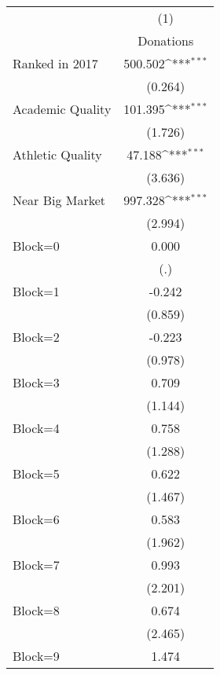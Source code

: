 {
\def\sym#1{\ifmmode^{#1}\else\(^{#1}\)\fi}
\begin{tabular}{l*{1}{c}}
\hline\hline
                    &\multicolumn{1}{c}{(1)}\\
                    &\multicolumn{1}{c}{Donations}\\
\hline
Ranked in 2017      &     500.502\sym{***}\\
                    &     (0.264)         \\
[1em]
Academic Quality    &     101.395\sym{***}\\
                    &     (1.726)         \\
[1em]
Athletic Quality    &      47.188\sym{***}\\
                    &     (3.636)         \\
[1em]
Near Big Market     &     997.328\sym{***}\\
                    &     (2.994)         \\
[1em]
Block=0             &       0.000         \\
                    &         (.)         \\
[1em]
Block=1             &      -0.242         \\
                    &     (0.859)         \\
[1em]
Block=2             &      -0.223         \\
                    &     (0.978)         \\
[1em]
Block=3             &       0.709         \\
                    &     (1.144)         \\
[1em]
Block=4             &       0.758         \\
                    &     (1.288)         \\
[1em]
Block=5             &       0.622         \\
                    &     (1.467)         \\
[1em]
Block=6             &       0.583         \\
                    &     (1.962)         \\
[1em]
Block=7             &       0.993         \\
                    &     (2.201)         \\
[1em]
Block=8             &       0.674         \\
                    &     (2.465)         \\
[1em]
Block=9             &       1.474         \\

\end{tabular}}
